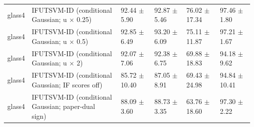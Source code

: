 \begin{table}[!t]
{\begin{tabular}{llllll}
glass4 & \shortstack[l]{IFUTSVM-ID (conditional\\Gaussian; u \(\times\) 0.25)} & 92.44 \(\pm\) 5.90 & 92.87 \(\pm\) 5.46 & 76.02 \(\pm\) 17.34 & 97.46 \(\pm\) 1.80 \\
glass4 & \shortstack[l]{IFUTSVM-ID (conditional\\Gaussian; u \(\times\) 0.5)} & 92.85 \(\pm\) 6.49 & 93.20 \(\pm\) 6.09 & 75.11 \(\pm\) 11.87 & 97.21 \(\pm\) 1.67 \\
glass4 & \shortstack[l]{IFUTSVM-ID (conditional\\Gaussian; u \(\times\) 2)} & 92.07 \(\pm\) 7.06 & 92.38 \(\pm\) 6.75 & 69.88 \(\pm\) 18.83 & 94.18 \(\pm\) 9.62 \\
glass4 & \shortstack[l]{IFUTSVM-ID (conditional\\Gaussian; IF scores off)} & 85.72 \(\pm\) 10.40 & 87.05 \(\pm\) 8.91 & 69.43 \(\pm\) 24.98 & 94.84 \(\pm\) 10.41 \\
glass4 & \shortstack[l]{IFUTSVM-ID (conditional\\Gaussian; paper-dual\\sign)} & 88.09 \(\pm\) 3.60 & 88.73 \(\pm\) 3.35 & 63.76 \(\pm\) 18.60 & 97.30 \(\pm\) 2.22 \\
\hline
\end{tabular}%
}
\end{table}

